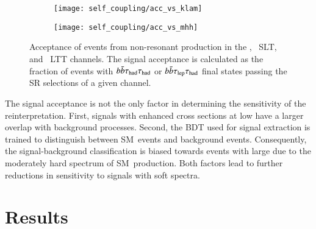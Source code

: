 \begin{figure}[htbp]
  \centering

  \begin{subfigure}[t]{0.485\textwidth}
    \texttt{[image: self\_coupling/acc\_vs\_klam]}
    \label{fig:acceptance_vs_klambda}
  \end{subfigure}\hfill%
  \begin{subfigure}[t]{0.485\textwidth}
    \texttt{[image: self\_coupling/acc\_vs\_mhh]}
    \label{fig:acceptance_vs_mhh}
  \end{subfigure}

  \caption[Acceptance of events from non-resonant \HH production in the \hadhad,
  \lephad~SLT, and \lephad~LTT channels.]{Acceptance of events from non-resonant
    \HH production in the \hadhad, \lephad~SLT, and \lephad~LTT channels. The
    signal acceptance is calculated as the fraction of events with
    $b\bar{b}\tau_{\text{had}}\tau_{\text{had}}$ or $b\bar{b}\tau_{\text{lep}}\tau_{\text{had}}$ final states passing the
    SR selections of a given channel.}%
  \label{fig:acceptance_vs_klambda_vs_mhh}
\end{figure}

The signal acceptance is not the only factor in determining the sensitivity of
the reinterpretation. First, signals with enhanced cross sections at low \mHH
have a larger overlap with background processes.
Second, the BDT used for signal extraction is trained to distinguish between
SM~\HH events and background events. Consequently, the signal-background
classification is biased towards events with large \mHH due to the moderately
hard \mHH spectrum of SM~\HH production. Both factors lead to further reductions
in sensitivity to signals with soft \mHH spectra.



\section{Results}%
\label{sec:reinterpretation_results}

